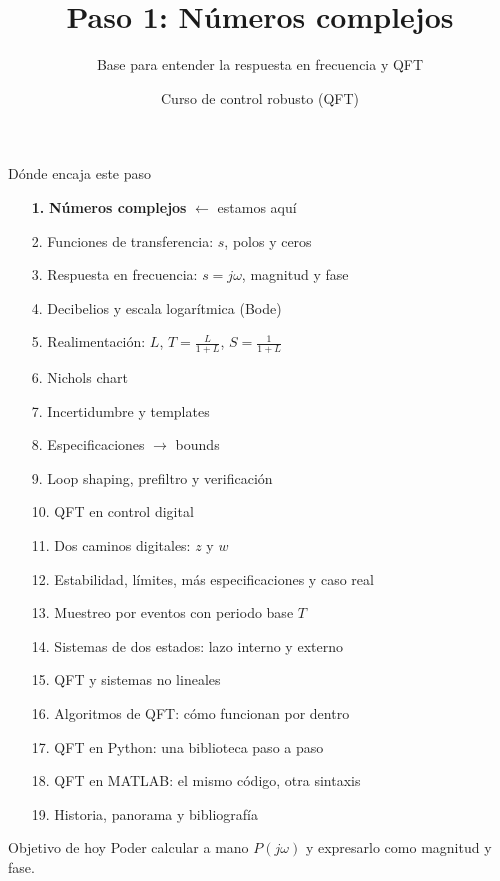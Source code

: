\documentclass[aspectratio=169,11pt]{beamer}
\title[Números complejos]{Paso 1: Números complejos}
\subtitle{Base para entender la respuesta en frecuencia y QFT}
\author{Curso de control robusto (QFT)}
\date{}
\begin{document}
\begin{frame}
  \titlepage
\end{frame}

\begin{frame}{Dónde encaja este paso}
  \tiny
  \begin{enumerate}\setlength{\itemsep}{-2pt}
    \item[\textbf{1.}] \textbf{Números complejos} \hfill $\leftarrow$ estamos aquí
    \item[2.] Funciones de transferencia: $s$, polos y ceros
    \item[3.] Respuesta en frecuencia: $s=j\omega$, magnitud y fase
    \item[4.] Decibelios y escala logarítmica (Bode)
    \item[5.] Realimentación: $L$, $T=\frac{L}{1+L}$, $S=\frac{1}{1+L}$
    \item[6.] Nichols chart
    \item[7.] Incertidumbre y templates
    \item[8.] Especificaciones $\rightarrow$ bounds
    \item[9.] Loop shaping, prefiltro y verificación
    \item[10.] QFT en control digital
    \item[11.] Dos caminos digitales: $z$ y $w$
    \item[12.] Estabilidad, límites, más especificaciones y caso real
    \item[13.] Muestreo por eventos con periodo base $T$
    \item[14.] Sistemas de dos estados: lazo interno y externo
    \item[15.] QFT y sistemas no lineales
    \item[16.] Algoritmos de QFT: cómo funcionan por dentro
    \item[17.] QFT en Python: una biblioteca paso a paso
    \item[18.] QFT en MATLAB: el mismo código, otra sintaxis
    \item[19.] Historia, panorama y bibliografía
  \end{enumerate}
  \vspace{4pt}
  \begin{block}{Objetivo de hoy}
    Poder calcular a mano $P(j\omega)$ y expresarlo como magnitud y fase.
  \end{block}
\end{frame}
\end{document}
